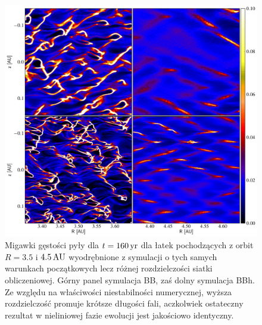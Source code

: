 \begin{figure}
   \includegraphics[width=0.98\linewidth]{figures/fig10}
   \caption{Migawki gęstości pyły dla $t = 160\hbox{$\thinspace\textrm{yr}$}$ dla łatek pochodzących z
      orbit $R=3.5$ i $4.5\hbox{$\thinspace\textrm{AU}$}$ wyodrębnione z symulacji o tych samych warunkach
      początkowych lecz różnej rozdzielczości siatki obliczeniowej. Górny panel
      symulacja BB, zaś dolny symulacja BBh. Ze względu na właściwości
      niestabilności numerycznej, wyższa rozdzielczość promuje krótsze długości
      fali, aczkolwiek ostateczny rezultat w nieliniowej fazie ewolucji jest
      jakościowo identyczny.} 
   \label{fig10} 
\end{figure}

